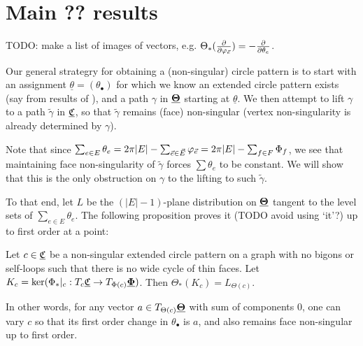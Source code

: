 \section{Main ?? results}


TODO: make a list of images of vectors, e.g.
$\Theta_*({\frac{\partial}{\partial \varphi_{\vec{e}}}}) = -{\frac{\partial}{\partial \theta_e}}$.


Our general strategry for obtaining a (non-singular) circle pattern
is to start with an assignment $\underline{\theta} = (\theta_\bullet)$
for which we know an extended circle pattern exists
(say from results of \cite{BandS}),
and a path $\gamma$ in ${\underline{\mathbf{\Theta}}}$ starting at $\underline{\theta}$.
We then attempt to lift $\gamma$ to a path $\tilde{\gamma}$ in ${\underline{\mathfrak{C}}}$,
so that $\tilde{\gamma}$ remains (face) non-singular
(vertex non-singularity is already determined by $\gamma$).

Note that since $\sum_{e\in E} \theta_e
= 2\pi |E| - \sum_{\vec{e} \in \vec{E}} \varphi_{\vec{e}}
= 2\pi |E| - \sum_{f\in F} \Phi_f$,
we see that maintaining face non-singularity of $\tilde{\gamma}$
forces $\sum \theta_e$ to be constant.
We will show that this is the only obstruction on $\gamma$
to the lifting to such $\tilde{\gamma}$.

To that end, let $L$ be the $(|E|-1)$-plane distribution on ${\underline{\mathbf{\Theta}}}$
tangent to the level sets of $\sum_{e\in E} \theta_e$.
The following proposition proves it (TODO avoid using `it'?) up to first order at a point:


\begin{proposition}
\label{p:point_lift}
Let $c \in {\underline{\mathfrak{C}}}$ be a
non-singular extended circle pattern on a graph
with no bigons or self-loops such that
there is no wide cycle of thin faces.
Let $K_c = \ker (\Phi_*|_c : T_c {\underline{\mathfrak{C}}} \to T_{\Phi(c)} {\underline{\mathbf{\Phi}}})$.
Then $\Theta_*(K_c) = L_{\Theta(c)}$.

In other words, for any vector $a \in T_{\Theta(c)} {\underline{\mathbf{\Theta}}}$
with sum of components 0, one can vary $c$ so that its
first order change in $\theta_\bullet$ is $a$,
and also remains face non-singular up to first order.
\end{proposition}


